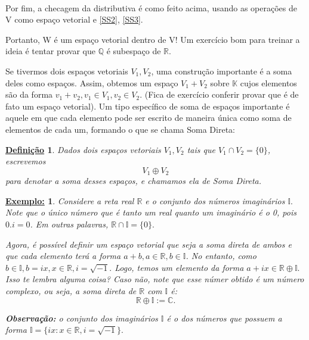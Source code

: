 \documentclass{article}
\newtheorem*{def*}{\underline{Defini\c c\~ao}}
\newtheorem{example}{\underline{Exemplo:}}[section]
\begin{document}
\paragraph*{} Por fim, a checagem da distributiva \'e como feito acima, usando as opera\c c\~oes
de V como espa\c co vetorial e \ref{SS2}, \ref{SS3}.

Portanto, W \'e um espa\c co vetorial dentro de V! Um exerc\'icio bom para treinar a ideia \'e
tentar provar que $\mathbb{Q}$ \'e subespa\c co de $\mathbb{R}$.

Se tivermos dois espa\c cos vetoriais $V_1, V_2$, uma constru\c c\~ao importante \'e a soma
deles como espa\c cos. Assim, obtemos um espa\c co $V_1 + V_2$ sobre $\mathbb{K}$ cujos elementos
s\~ao da forma $v_1 + v_2, v_1\in{V_1}, v_2\in{V_2}$. (Fica de exerc\'icio conferir provar
que \'e de fato um espa\c co vetorial). Um tipo espec\'ifico de soma de espa\c cos importante
\'e aquele em que cada elemento pode ser escrito de maneira \'unica como soma de elementos de cada
um, formando o que se chama Soma Direta:
\begin{def*}
	Dados dois espa\c cos vetoriais $V_1, V_2$ tais que $V_1\cap{V_2} = \{0\}$, escrevemos
	$$
		V_1 \oplus{V_2}
	$$
	para denotar a soma desses espa\c cos, e chamamos ela de Soma Direta.
\end{def*}

\begin{example}
	Considere a reta real $\mathbb{R}$ e o conjunto dos n\'umeros imagin\'arios $\mathbb{I}.$ Note
	que o \'unico n\'umero que \'e tanto um real quanto um imagin\'ario \'e o 0, pois $0.i = 0$.
	Em outras palavras, $\mathbb{R}\cap\mathbb{I} = \{0\}.$

	Agora, \'e poss\'ivel definir um espa\c co vetorial que seja a soma direta de ambos e que cada elemento ter\'a a forma
	$a + b, a\in\mathbb{R}, b\in\mathbb{I}$. No entanto, como $b\in{\mathbb{I}}, b = ix, x\in\mathbb{R}
		, i = \sqrt{-1}.$ Logo, temos um elemento da forma $a + ix \in\mathbb{R}\oplus\mathbb{I}.$
	Isso te lembra alguma coisa? Caso n\~ao, note que esse n\'umer obtido \'e um n\'umero complexo,
	ou seja, a soma direta de $\mathbb{R}$ com $\mathbb{I}$ \'e:
	$$
		\mathbb{R}\oplus\mathbb{I} := \mathbb{C}.
	$$

	\textbf{Observa\c c\~ao:} o conjunto dos imagin\'arios $\mathbb{I}$ \'e o dos n\'umeros
	que possuem a forma $\mathbb{I}=\{ix: x\in\mathbb{R}, i = \sqrt{-1}\}.$
\end{example}
\end{document}
